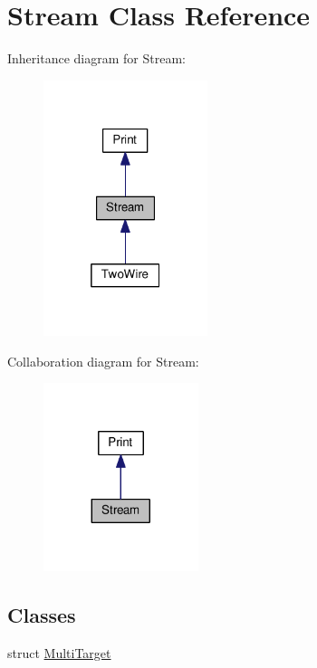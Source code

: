 \hypertarget{class_stream}{}\section{Stream Class Reference}
\label{class_stream}


Inheritance diagram for Stream\+:\nopagebreak
\begin{figure}[H]
\begin{center}
\leavevmode
\includegraphics[width=136pt]{class_stream__inherit__graph}
\end{center}
\end{figure}


Collaboration diagram for Stream\+:\nopagebreak
\begin{figure}[H]
\begin{center}
\leavevmode
\includegraphics[width=128pt]{class_stream__coll__graph}
\end{center}
\end{figure}
\subsection*{Classes}
\begin{DoxyCompactItemize}
\item 
struct \hyperlink{struct_stream_1_1_multi_target}{Multi\+Target}
\end{DoxyCompactItemize}
